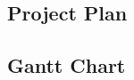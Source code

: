 \documentclass[12pt]{article}  %
\begin{document}
\begin{appendices}


\let\cleardoublepage\clearpage
\section{Project Plan}
\label{appendix:gantt}
\subsection{Gantt Chart}





\end{appendices}
\end{document}
